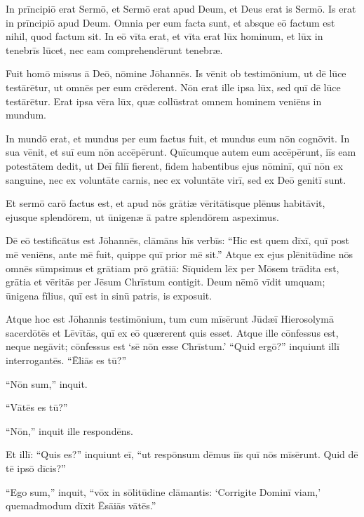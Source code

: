 

\Caput
\Versus In prīncipiō erat Sermō, et Sermō erat apud Deum, et Deus erat is Sermō.
\Versus Is erat in prīncipiō apud Deum.
\Versus Omnia per eum facta sunt, et absque eō factum est nihil, quod factum sit.
\Versus In eō vīta erat, et vīta erat lūx hominum,
\Versus et lūx in tenebrīs lūcet, nec eam comprehendērunt tenebræ.

\Versus Fuit homō missus ā Deō, nōmine Jōhannēs.
\Versus Is vēnit ob testimōnium, ut dē lūce testārētur, ut omnēs per eum crēderent.
\Versus Nōn erat ille ipsa lūx, sed quī dē lūce testārētur.
\Versus Erat ipsa vēra lūx, quæ collūstrat omnem hominem veniēns in mundum.

\Versus In mundō erat, et mundus per eum factus fuit, et mundus eum nōn cognōvit.
\Versus In sua vēnit, et suī eum nōn accēpērunt.
\Versus Quīcumque autem eum accēpērunt, iīs eam potestātem dedit, ut Deī fīliī fierent, fidem habentibus ejus nōminī,
\Versus quī nōn ex sanguine, nec ex voluntāte carnis, nec ex voluntāte virī, sed ex Deō genitī sunt.

\Versus Et sermō carō factus est, et apud nōs grātiæ vēritātisque plēnus habitāvit, ejusque splendōrem, ut ūnigenæ ā patre splendōrem aspeximus.

\Versus Dē eō testificātus est Jōhannēs, clāmāns hīs verbīs: ``Hic est quem dīxī, quī post mē veniēns, ante mē fuit, quippe quī prior mē sit.''
\Versus Atque ex ejus plēnitūdine nōs omnēs sūmpsimus et grātiam prō grātiā:
\Versus Sīquidem lēx per Mōsem trādita est, grātia et vēritās per Jēsum Chrīstum contigit.
\Versus Deum nēmō vīdit umquam; ūnigena fīlius, quī est in sinū patris, is exposuit.

\Versus Atque hoc est Jōhannis testimōnium, tum cum mīsērunt Jūdæī Hierosolymā sacerdōtēs et Lēvītās, quī ex eō quærerent quis esset.
\Versus Atque ille cōnfessus est, neque negāvit; cōnfessus est `sē nōn esse Chrīstum.'
\Versus ``Quid ergō?'' inquiunt illī interrogantēs. ``Ēliās es tū?''

``Nōn sum,'' inquit.

``Vātēs es tū?''

``Nōn,'' inquit ille respondēns.

\Versus Et illī: ``Quis es?'' inquiunt eī, ``ut respōnsum dēmus iīs quī nōs mīsērunt. Quid dē tē ipsō dīcis?''

\Versus ``Ego sum,'' inquit, ``vōx in sōlitūdine clāmantis: `Corrigite Dominī viam,' quemadmodum dīxit Ēsāiās vātēs.''

